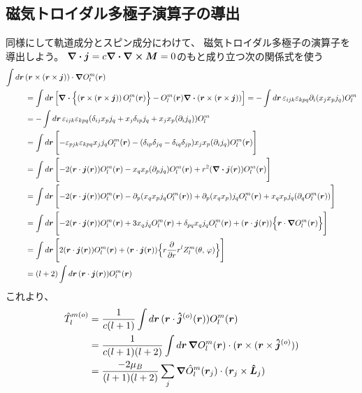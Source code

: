 \documentclass[../master.tex]{subfiles}
\begin{document}
\subsection{磁気トロイダル多極子演算子の導出}
同様にして軌道成分とスピン成分にわけて、
磁気トロイダル多極子の演算子を導出しよう。
\(\div \vb*{j}= c\div \curl \vb*{M}=0\)のもと成り立つ次の関係式を使う
\begin{align}
    \int d\vb*{r}\,& (\vb*{r}\times(\vb*{r}\times \vb*{j})) \cdot \grad O_l^m(\vb*{r}) \notag\\
    &= \int d\vb*{r}\, \qty[\div\Bigl\{(\vb*{r}\times(\vb*{r}\times \vb*{j}))\,O_l^m(\vb*{r})\Bigr\}
    -O_l^m(\vb*{r})\div(\vb*{r}\times(\vb*{r}\times \vb*{j}))]
    = - \int d\vb*{r}\, \varepsilon_{ijk}\varepsilon_{kpq}\partial_i(x_j x_p j_q)O_l^m\\
    &= - \int d\vb*{r}\, \varepsilon_{ijk}\varepsilon_{kpq}(\delta_{ij}x_p j_q + x_j \delta_{ip} j_q + x_j x_p( \partial_i j_q))O_l^m\\
    &= \int d\vb*{r}\,\Biggl[- \varepsilon_{pjk}\varepsilon_{kpq} x_j j_q O_l^m(\vb*{r})
    - (\delta_{ip}\delta_{jq}-\delta_{iq}\delta_{jp})x_j x_p (\partial_i j_q) O_l^m(\vb*{r})\Biggr]\\
    &= \int d\vb*{r}\,\Biggl[ -2(\vb*{r}\cdot\vb*{j}(\vb*{r})) O_l^m(\vb*{r})
    - x_q x_p (\partial_p j_q) O_l^m(\vb*{r})
    + r^2(\div \vb*{j}(\vb*{r})) O_l^m(\vb*{r}) \Biggr]\\
    &= \int d\vb*{r}\, \Biggl[-2(\vb*{r}\cdot\vb*{j}(\vb*{r})) O_l^m(\vb*{r})
    - \partial_p\qty( x_q x_p j_q O_l^m(\vb*{r}))
    + \partial_p(x_q x_p) j_q O_l^m(\vb*{r})
    + x_q x_p j_q (\partial_q O_l^m(\vb*{r})) \Biggr]\\
    &= \int d\vb*{r}\, \Biggl[-2(\vb*{r}\cdot\vb*{j}(\vb*{r})) O_l^m(\vb*{r})
    + 3 x_q j_q O_l^m(\vb*{r})
    + \delta_{pq}x_q j_q O_l^m(\vb*{r})
    + (\vb*{r}\cdot \vb*{j}(\vb*{r})) \Bigl\{\vb*{r}\cdot \grad O_l^m(\vb*{r})\Bigr\}\Biggr]\\
    &= \int d\vb*{r}\, \Biggl[2(\vb*{r}\cdot\vb*{j}(\vb*{r})) O_l^m(\vb*{r})
    + (\vb*{r}\cdot \vb*{j}(\vb*{r})) \Bigl\{r\pdv{r}r^l Z_l^m(\theta,\,\varphi)\Bigr\}\Biggr]\\
    &= (l+2)\int d\vb*{r}\, (\vb*{r}\cdot\vb*{j}(\vb*{r})) O_l^m(\vb*{r})
\end{align}
これより、
\begin{align}
    \hat{T}_l^{m(o)} &= \frac{1}{c(l+1)} \int d\vb*{r}\, (\vb*{r}\cdot \vb*{\hat{j}}^{(o)}(\vb*{r}))O_l^m(\vb*{r})\\
    &=\frac{1}{c(l+1)(l+2)}\int d\vb*{r}\, \grad O_l^m(\vb*{r}) \cdot (\vb*{r}\times(\vb*{r}\times \vb*{\hat{j}}^{(o)})) \\
    &= \frac{-2\mu_B}{(l+1)(l+2)}\sum_j \grad \hat{O}_l^m(\vb*{r}_j) \cdot (\vb*{r}_j\times \vb*{\hat{L}}_j)
\end{align}
\end{document}
